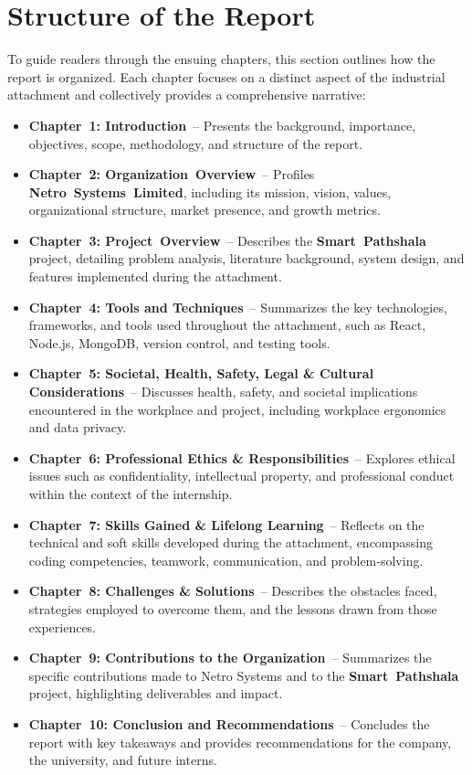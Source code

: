 \documentclass[12pt,a4paper]{report}
\newcommand{\company}[1]{\textcolor{companycolor}{\textbf{#1}}}
\newcommand{\project}[1]{\textcolor{projectcolor}{\textbf{#1}}}
\newcommand{\impact}[1]{\textcolor{impactcolor}{\textbf{#1}}}
\newenvironment{coloritemize}
{\begin{itemize}[label=\textcolor{primaryblue}{$\bullet$}]}
{\end{itemize}}
\begin{document}
\section{Structure of the Report}
\label{sec:report_structure}
To guide readers through the ensuing chapters, this section outlines how the report is organized. Each chapter focuses on a distinct aspect of the industrial attachment and collectively provides a comprehensive narrative:
\begin{coloritemize}
    \item \impact{\textbf{Chapter 1: Introduction}} – Presents the background, importance, objectives, scope, methodology, and structure of the report.
    \item \impact{\textbf{Chapter 2: Organization Overview}} – Profiles \company{Netro Systems Limited}, including its mission, vision, values, organizational structure, market presence, and growth metrics.
    \item \impact{\textbf{Chapter 3: Project Overview}} – Describes the \project{Smart Pathshala} project, detailing problem analysis, literature background, system design, and features implemented during the attachment.
    \newpage
    \item \impact{\textbf{Chapter 4: Tools and Techniques}} – Summarizes the key technologies, frameworks, and tools used throughout the attachment, such as React, Node.js, MongoDB, version control, and testing tools.
    \item \impact{\textbf{Chapter 5: Societal, Health, Safety, Legal & Cultural Considerations}} – Discusses health, safety, and societal implications encountered in the workplace and project, including workplace ergonomics and data privacy.
    \item \impact{\textbf{Chapter 6:  Professional Ethics & Responsibilities}} – Explores ethical issues such as confidentiality, intellectual property, and professional conduct within the context of the internship.
    \item \impact{\textbf{Chapter 7: Skills Gained & Lifelong Learning}} – Reflects on the technical and soft skills developed during the attachment, encompassing coding competencies, teamwork, communication, and problem‑solving.
    \item \impact{\textbf{Chapter 8: Challenges & Solutions}} – Describes the obstacles faced, strategies employed to overcome them, and the lessons drawn from those experiences.
    \item \impact{\textbf{Chapter 9: Contributions to the Organization}} – Summarizes the specific contributions made to Netro Systems and to the \project{Smart Pathshala} project, highlighting deliverables and impact.
    \item \impact{\textbf{Chapter 10: Conclusion and Recommendations}} – Concludes the report with key takeaways and provides recommendations for the company, the university, and future interns.
\end{coloritemize}
\end{document}
